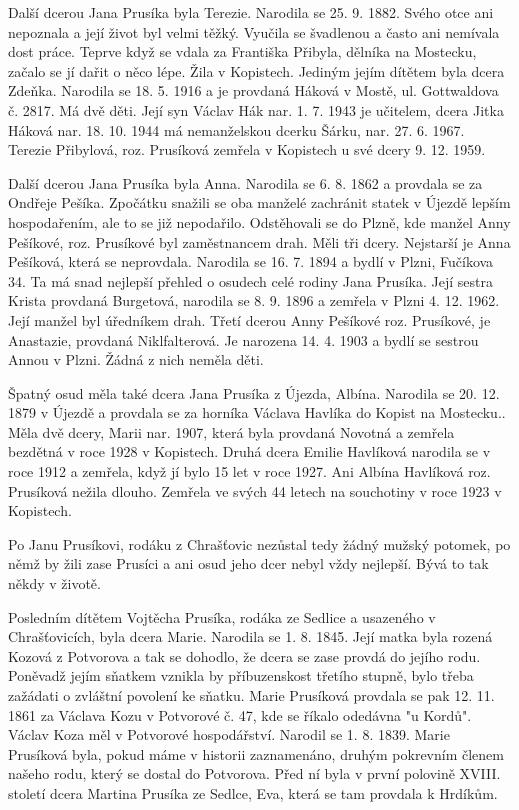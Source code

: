 \documentclass[../dejiny-rodu-prusiku.tex]{subfiles}
\begin{document}
Další dcerou Jana Prusíka byla Terezie. Narodila se 25. 9. 1882. Svého otce ani nepoznala a její život byl velmi těžký. Vyučila se švadlenou a často ani nemíva­la dost práce. Teprve když se vdala za Františka Přibyla, dělníka na Mostecku, začalo se jí dařit o něco lépe. Žila v Kopistech. Jediným jejím dítětem byla dcera Zdeňka. Narodila se 18. 5. 1916 a je provdaná Háková v Mostě, ul. Gottwaldova č. 2817. Má dvě děti. Její syn Václav Hák nar. 1. 7. 1943 je učitelem, dcera Jitka Háková nar. 18. 10. 1944 má nemanželskou dcerku Šárku, nar. 27. 6. 1967. Terezie Přibylová, roz. Prusíková zemře­la v Kopistech u své dcery 9. 12. 1959.

Další dcerou Jana Prusíka byla Anna. Narodila se 6. 8. 1862 a provdala se za Ondřeje Pešíka. Zpočátku snažili se oba manželé zachránit statek v Újezdě lepším hospodařením, ale to se již nepodařilo. Odstěhovali se do Plzně, kde manžel Anny Pešíkové, roz. Prusíkové byl zaměstnancem drah. Měli tři dcery. Nejstarší je Anna Pešíková, která se neprovdala. Narodila se 16. 7. 1894 a bydlí v Plzni, Fučíkova 34. Ta má snad nejlepší přehled o osudech celé rodiny Jana Prusíka. Její sestra Krista provdaná Burgetová, narodila se 8. 9. 1896 a zemřela v Plzni 4. 12. 1962. Její manžel byl úředníkem drah. Třetí dcerou Anny Pešíkové roz. Prusíkové, je Anastazie, provdaná Niklfalterová. Je narozena 14. 4. 1903 a bydlí se sestrou Annou v Plzni. Žádná z nich neměla děti.

Špatný osud měla také dcera Jana Prusíka z Újezda, Albína. Narodila se 20. 12. 1879 v Újezdě a provdala se za horníka Václava Havlíka do Kopist na Mostecku.. Měla dvě dcery, Marii nar. 1907, která byla provdaná Novotná a zemřela bezdětná v roce 1928 v Kopistech. Druhá dcera Emilie Havlíková narodila se v roce 1912 a zemřela, když jí bylo 15 let v roce 1927. Ani Albína Havlíková roz. Prusíková nežila dlouho. Zemře­la ve svých 44 letech na souchotiny v roce 1923 v Kopistech.

Po Janu Prusíkovi, rodáku z Chrašťovic nezůstal te­dy žádný mužský potomek, po němž by žili zase Prusíci a ani osud jeho dcer nebyl vždy nejlepší. Bývá to tak někdy v životě.

Posledním dítětem Vojtěcha Prusíka, rodáka ze Sedlice a usazeného v Chrašťovicích, byla dcera Marie. Narodi­la se 1. 8. 1845. Její matka byla rozená Kozová z Potvo­rova a tak se dohodlo, že dcera se zase provdá do je­jího rodu. Poněvadž jejím sňatkem vznikla by příbuzenskost třetího stupně, bylo třeba zažádati o zvláštní povole­ní ke sňatku. Marie Prusíková provdala se pak 12. 11. 1861 za Václava Kozu v Potvorové č. 47, kde se říkalo odedávna "u Kordů". Václav Koza měl v Potvorové hospodářství. Narodil se 1. 8. 1839.  Marie Prusíková byla, pokud máme v historii zaznamenáno, druhým pokrevním členem našeho rodu, který se dostal do Potvorova. Před ní byla v první polovině XVIII. století dcera Martina Prusíka ze Sedlce, Eva, která se tam provdala k Hrdíkům.
\end{document}
